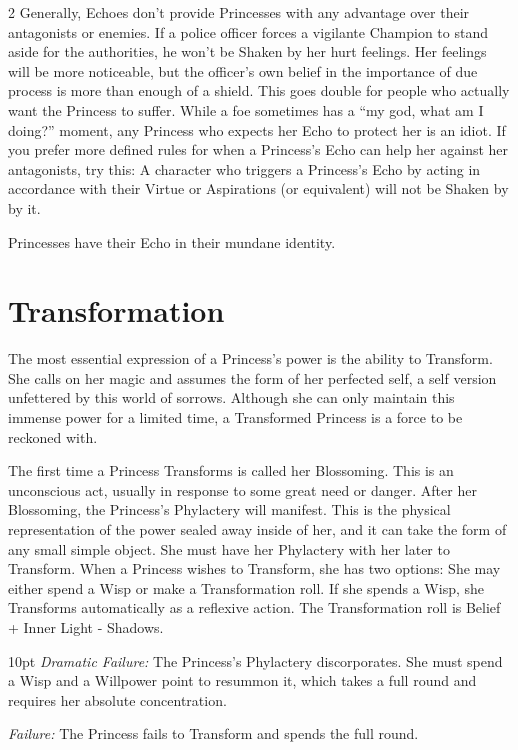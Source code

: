 \begin{multicols}{2}
Generally, Echoes don't provide Princesses with any advantage over their antagonists or enemies. If a police officer forces a vigilante Champion to stand aside for the authorities, he won't be Shaken by her hurt feelings. Her feelings will be more noticeable, but the officer's own belief in the importance of due process is more than enough of a shield. This goes double for people who actually want the Princess to suffer. While a foe sometimes has a “my god, what am I doing?” moment, any Princess who expects her Echo to protect her is an idiot. If you prefer more defined rules for when a Princess's Echo can help her against her antagonists, try this: A character who triggers a Princess's Echo by acting in accordance with their Virtue or Aspirations (or equivalent) will not be Shaken by by it. 

Princesses have their Echo in their mundane identity. 

\section*{Transformation}
\label{sec:Transformation}
The most essential expression of a Princess's power is the ability to Transform. She calls on her magic and assumes the form of her perfected self, a self version unfettered by this world of sorrows. Although she can only maintain this immense power for a limited time, a Transformed Princess is a force to be reckoned with.

The first time a Princess Transforms is called her Blossoming. This is an unconscious act, usually in response to some great need or danger. After her Blossoming, the Princess's Phylactery will manifest. This is the physical representation of the power sealed away inside of her, and it can take the form of any small simple object. She must have her Phylactery with her later to Transform. When a Princess wishes to Transform, she has two options: She may either spend a Wisp or make a Transformation roll. If she spends a Wisp, she Transforms automatically as a reflexive action. The Transformation roll is Belief + Inner Light - Shadows. 

\begin{myindentpar}{10pt}
    \emph{Dramatic Failure:} The Princess's Phylactery discorporates. She must spend a Wisp and a Willpower point to resummon it, which takes a full round and requires her absolute concentration. 
    
    \emph{Failure:} The Princess fails to Transform and spends the full round. 
    

\end{myindentpar}
\end{multicols}
